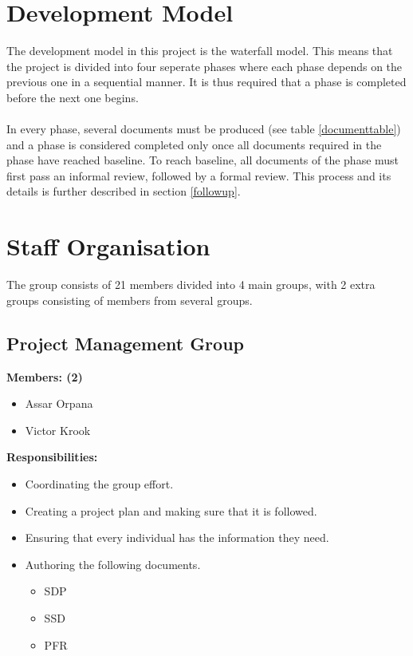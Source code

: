 \documentclass{article}
\begin{document}
\section{Development Model} %
    The development model in this project is the waterfall model. This
    means that the project is divided into four seperate phases where each phase depends
    on the previous one in a sequential manner. It is thus required that a phase is
    completed before the next one begins.
    \\ \\
    In every phase, several documents must be produced (see table \ref{documenttable}) and a phase
    is considered completed only once all documents required in the phase have reached baseline.
    To reach baseline, all documents of the phase must first pass an informal review, 
    followed by a formal review. This process and its details is further described in section \ref{followup}.
    
\section{Staff Organisation} %
    The group consists of 21 members divided into 4 main groups, with 2 extra groups consisting of members from several groups. 
    
    \subsection{Project Management Group}
        \textbf{Members: (2)}
        \begin{itemize}
            \item Assar Orpana
            \item Victor Krook
        \end{itemize}
        \textbf{Responsibilities:}
        \begin{itemize}
            \item Coordinating the group effort.
            \item Creating a project plan and making sure that it is followed.
            \item Ensuring that every individual has the information they need.
            \item Authoring the following documents.
                \begin{itemize}
                    \item SDP
                    \item SSD
                    \item PFR
                \end{itemize} 
        \end{itemize}
        
\end{document}
